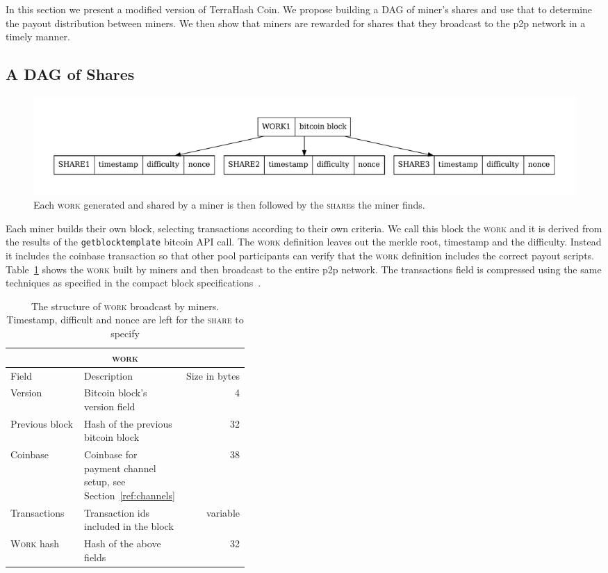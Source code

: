 \documentclass{article}
\begin{document}
In this section we present a modified version of TerraHash Coin. We
propose building a DAG of miner's shares and use that to determine the
payout distribution between miners. We then show that miners are
rewarded for shares that they broadcast to the p2p network in a timely
manner.

\subsection{A DAG of Shares}

\begin{figure}
  \begin{center}
    \includegraphics[width=1\textwidth]{work-share}
    \caption{Each \textsc{work} generated and shared by a miner is then
      followed by the \textsc{share}s the miner finds.}\label{fig:work-share}
    \end{center}
\end{figure}

Each miner builds their own block, selecting transactions according to
their own criteria. We call this block the \textsc{work} and it is
derived from the results of the \verb|getblocktemplate| bitcoin API
call. The \textsc{work} definition leaves out the merkle root,
timestamp and the difficulty. Instead it includes the coinbase
transaction so that other pool participants can verify that the
\textsc{work} definition includes the correct payout
scripts. Table~\ref{table:work} shows the \textsc{work} built by
miners and then broadcast to the entire p2p network. The transactions
field is compressed using the same techniques as specified in the
compact block specifications~\cite{compact-blocks}.

\begin{table}
  \centering
  \begin{tabular}{ |l|p{0.4\linewidth}|r| }
    \hline
    \multicolumn{3}{|c|}{\textsc{work}} \\
    \hline
    Field & Description & Size in bytes \\
    \hline
    Version & Bitcoin block's version field & 4\\
    \hline
    Previous block & Hash of the previous bitcoin block & 32 \\
    \hline
    Coinbase & Coinbase for payment channel setup, see Section~\ref{ref:channels} & 38 \\
    \hline
    Transactions & Transaction ids included in the block & variable \\
    \hline
    \textsc{Work} hash & Hash of the above fields & 32 \\
    \hline
  \end{tabular}
  \caption{The structure of \textsc{work} broadcast by
    miners. Timestamp, difficult and nonce are left for the
    \textsc{share} to specify }\label{table:work}
\end{table}
\end{document}
